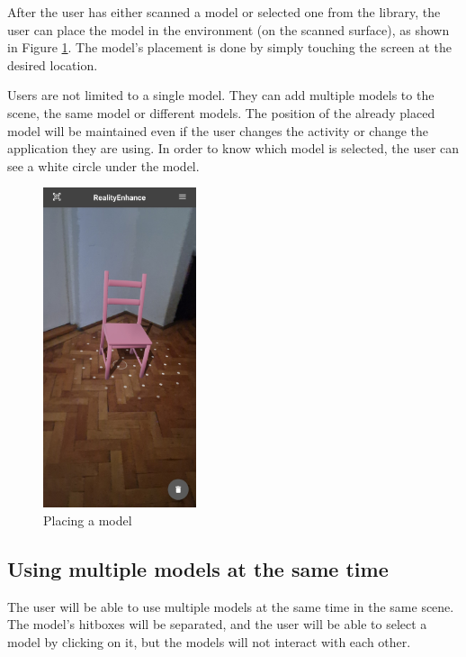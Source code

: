 After the user has either scanned a model or selected one from the library, the user can place the model in the environment (on the scanned surface), as shown in Figure \ref{fig:placed-model}. The model's placement is done by simply touching the screen at the desired location.

Users are not limited to a single model. They can add multiple models to the scene, the same model or different models. The position of the already placed model will be maintained even if the user changes the activity or change the application they are using. In order to know which model is selected, the user can see a white circle under the model.
\begin{figure}[ht]
    \begin{center}
        \includegraphics[width=0.4\textwidth]{img/App_screenshots/Model-placed.jpg}
        \caption{Placing a model}
        \label{fig:placed-model}
    \end{center}
\end{figure}
\pagebreak

\subsection{Using multiple models at the same time}
The user will be able to use multiple models at the same time in the same scene. The model's hitboxes will be separated, and the user will be able to select a model by clicking on it, but the models will not interact with each other.

